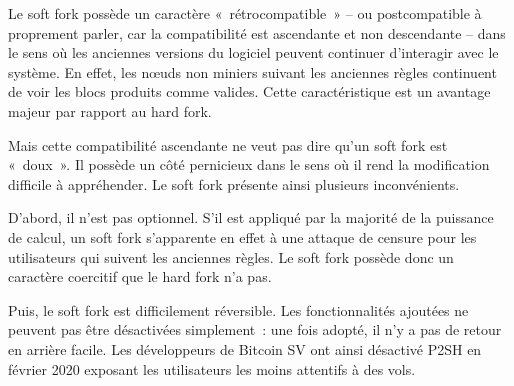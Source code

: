 
Le soft fork possède un caractère «~rétrocompatible~» -- ou postcompatible à proprement parler, car la compatibilité est ascendante et non descendante -- dans le sens où les anciennes versions du logiciel peuvent continuer d'interagir avec le système. En effet, les nœuds non miniers suivant les anciennes règles continuent de voir les blocs produits comme valides. Cette caractéristique est un avantage majeur par rapport au hard fork.


Mais cette compatibilité ascendante ne veut pas dire qu'un soft fork est «~doux~». Il possède un côté pernicieux dans le sens où il rend la modification difficile à appréhender. Le soft fork présente ainsi plusieurs inconvénients.

D'abord, il n'est pas optionnel. S'il est appliqué par la majorité de la puissance de calcul, un soft fork s'apparente en effet à une attaque de censure pour les utilisateurs qui suivent les anciennes règles. Le soft fork possède donc un caractère coercitif que le hard fork n'a pas.

Puis, le soft fork est difficilement réversible. Les fonctionnalités ajoutées ne peuvent pas être désactivées simplement~: une fois adopté, il n'y a pas de retour en arrière facile. Les développeurs de Bitcoin SV ont ainsi désactivé P2SH en février 2020 exposant les utilisateurs les moins attentifs à des vols.

